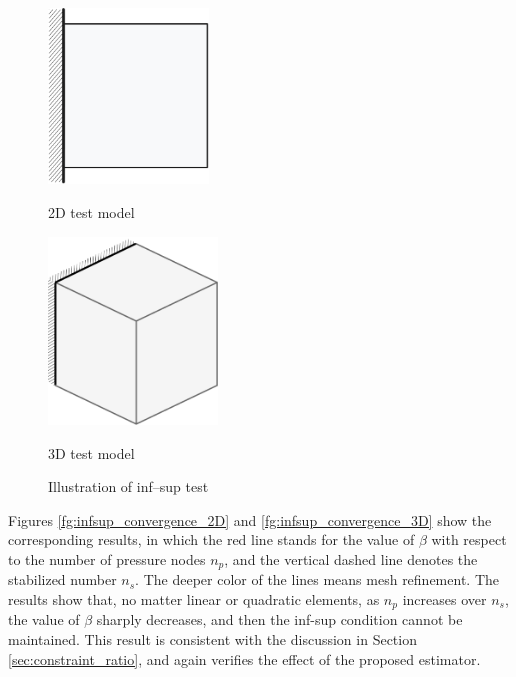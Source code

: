 \begin{figure}[H]
\centering
\begin{subcaptiongroup}
\parbox[b]{0.4\textwidth}{
\includegraphics[width=0.38\textwidth]{png/infsup_model.png}\caption{2D test model}\label{infsup_convergence_2D}
}
\hspace{20pt}
\parbox[b]{0.4\textwidth}{
\includegraphics[width=0.4\textwidth]{png/inf_sup_block.png}\caption{3D test model}\label{infsup_convergence_3D}
}
\end{subcaptiongroup}
\caption{Illustration of inf--sup test}\label{fg:inf_sup_test}
\end{figure}

Figures \ref{fg:infsup_convergence_2D} and \ref{fg:infsup_convergence_3D} show the corresponding results, in which the red line stands for the value of $\beta$ with respect to the number of pressure nodes $n_p$, and the vertical dashed line denotes the stabilized number $n_s$. The deeper color of the lines means mesh refinement. The results show that, no matter linear or quadratic elements, as $n_p$ increases over $n_s$, the value of $\beta$ sharply decreases, and then the inf-sup condition cannot be maintained. This result is consistent with the discussion in Section \ref{sec:constraint_ratio}, and again verifies the effect of the proposed estimator.

